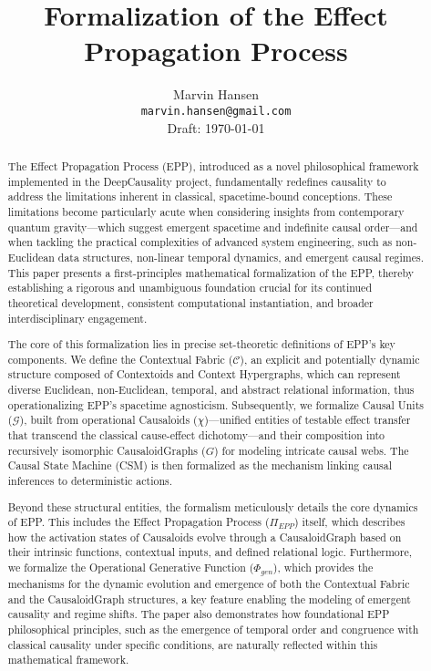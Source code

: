 \documentclass{article}
\title{Formalization of the Effect Propagation Process}
\author{
  Marvin Hansen \\
  \texttt{marvin.hansen@gmail.com} \\
  Draft: \today
}
\begin{document}
\maketitle


\begin{abstract}

The Effect Propagation Process (EPP), introduced as a novel philosophical framework implemented in the DeepCausality project, fundamentally redefines causality to address the limitations inherent in classical, spacetime-bound conceptions. These limitations become particularly acute when considering insights from contemporary quantum gravity—which suggest emergent spacetime and indefinite causal order—and when tackling the practical complexities of advanced system engineering, such as non-Euclidean data structures, non-linear temporal dynamics, and emergent causal regimes. This paper presents a first-principles mathematical formalization of the EPP, thereby establishing a rigorous and unambiguous foundation crucial for its continued theoretical development, consistent computational instantiation, and broader interdisciplinary engagement.

The core of this formalization lies in precise set-theoretic definitions of EPP's key components. We define the {Contextual Fabric} (\(\mathcal{C}\)), an explicit and potentially dynamic structure composed of {Contextoids} and {Context Hypergraphs}, which can represent diverse Euclidean, non-Euclidean, temporal, and abstract relational information, thus operationalizing EPP's spacetime agnosticism. Subsequently, we formalize {Causal Units} (\(\mathcal{G}\)), built from operational {Causaloids} (\(\chi\))—unified entities of testable effect transfer that transcend the classical cause-effect dichotomy—and their composition into recursively isomorphic {CausaloidGraphs} (\(G\)) for modeling intricate causal webs. The Causal State Machine (CSM) is then formalized as the mechanism linking causal inferences to deterministic actions.

Beyond these structural entities, the formalism meticulously details the {core dynamics} of EPP. This includes the Effect Propagation Process (\(\Pi_{EPP}\)) itself, which describes how the activation states of {Causaloids} evolve through a {CausaloidGraph} based on their intrinsic functions, contextual inputs, and defined relational logic. Furthermore, we formalize the Operational Generative Function (\(\Phi_{gen}\)), which provides the mechanisms for the dynamic evolution and emergence of both the Contextual Fabric and the CausaloidGraph structures, a key feature enabling the modeling of emergent causality and regime shifts. The paper also demonstrates how foundational EPP philosophical principles, such as the emergence of temporal order and congruence with classical causality under specific conditions, are naturally reflected within this mathematical framework.


\end{abstract}
\end{document}
